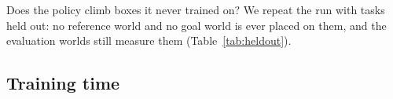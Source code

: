 Does the policy climb boxes it never trained on? We repeat the run with tasks held out: no reference world and no goal world is ever placed on them, and the evaluation worlds still measure them (Table~\ref{tab:heldout}). \heldoutSentence{}

\begin{table}[t]
\centering
\caption{Tasks held out of training: no world of either kind is placed on them. Success averaged over the tasks.}
\label{tab:heldout}
\setlength{\tabcolsep}{4pt}

\end{table}

\subsection{Training time}

\timeSentence{}
